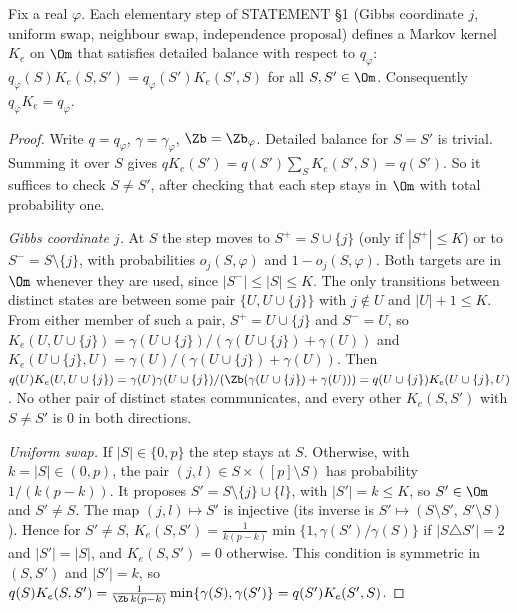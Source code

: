 \documentclass[11pt]{report}
\begin{document}
\begin{T12lemma}\label{T12:lem:rev}
Fix a real $\varphi$. Each elementary step of STATEMENT \S1 (Gibbs coordinate $j$, uniform swap, neighbour swap, independence proposal) defines a Markov kernel $K_e$ on $\Om$ that satisfies detailed balance with respect to $q_\varphi$: $q_\varphi(S)K_e(S,S')=q_\varphi(S')K_e(S',S)$ for all $S,S'\in\Om$. Consequently $q_\varphi K_e=q_\varphi$.
\end{T12lemma}
\begin{proof}
Write $q=q_\varphi$, $\gamma=\gamma_\varphi$, $\Zb=\Zb_\varphi$. Detailed balance for $S=S'$ is trivial. Summing it over $S$ gives $q K_e(S')=q(S')\sum_SK_e(S',S)=q(S')$. So it suffices to check $S\ne S'$, after checking that each step stays in $\Om$ with total probability one.

\emph{Gibbs coordinate $j$.} At $S$ the step moves to $S^+=S\cup\{j\}$ (only if $|S^+|\le K$) or to $S^-=S\setminus\{j\}$, with probabilities $o_j(S,\varphi)$ and $1-o_j(S,\varphi)$. Both targets are in $\Om$ whenever they are used, since $|S^-|\le |S|\le K$. The only transitions between distinct states are between some pair $\{U,U\cup\{j\}\}$ with $j\notin U$ and $|U|+1\le K$. From either member of such a pair, $S^+=U\cup\{j\}$ and $S^-=U$, so $K_e(U,U\cup\{j\})=\gamma(U\cup\{j\})/(\gamma(U\cup\{j\})+\gamma(U))$ and $K_e(U\cup\{j\},U)=\gamma(U)/(\gamma(U\cup\{j\})+\gamma(U))$. Then
$q(U)K_e(U,U\cup\{j\})=\gamma(U)\gamma(U\cup\{j\})/(\Zb(\gamma(U\cup\{j\})+\gamma(U)))=q(U\cup\{j\})K_e(U\cup\{j\},U)$. No other pair of distinct states communicates, and every other $K_e(S,S')$ with $S\ne S'$ is $0$ in both directions.

\emph{Uniform swap.} If $|S|\in\{0,p\}$ the step stays at $S$. Otherwise, with $k=|S|\in(0,p)$, the pair $(j,l)\in S\times([p]\setminus S)$ has probability $1/(k(p-k))$. It proposes $S'=S\setminus\{j\}\cup\{l\}$, with $|S'|=k\le K$, so $S'\in\Om$ and $S'\neq S$. The map $(j,l)\mapsto S'$ is injective (its inverse is $S'\mapsto(S\setminus S',\,S'\setminus S)$). Hence for $S'\ne S$, $K_e(S,S')=\frac{1}{k(p-k)}\min\{1,\gamma(S')/\gamma(S)\}$ if $|S\triangle S'|=2$ and $|S'|=|S|$, and $K_e(S,S')=0$ otherwise. This condition is symmetric in $(S,S')$ and $|S'|=k$, so
$q(S)K_e(S,S')=\frac{1}{\Zb\,k(p-k)}\min\{\gamma(S),\gamma(S')\}=q(S')K_e(S',S)$.


\end{proof}
\end{document}
